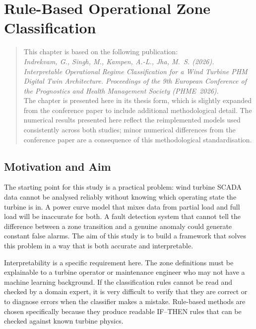 \chapter{Rule-Based Operational Zone Classification}
\label{chap:ch3}

\begin{quote}
\small
This chapter is based on the following publication:\\[4pt]
\textit{Indrekvam, G., Singh, M., Kampen, A.-L., Jha, M.~S. (2026).
Interpretable Operational Regime Classification for a Wind Turbine PHM Digital Twin
Architecture. Proceedings of the 9th European Conference of the Prognostics and Health
Management Society (PHME~2026).}\\[4pt]
The chapter is presented here in its thesis form, which is slightly expanded from the
conference paper to include additional methodological detail. The numerical results
presented here reflect the reimplemented models used consistently across both studies;
minor numerical differences from the conference paper are a consequence of this
methodological standardisation.
\end{quote}

\section{Motivation and Aim}
\label{sec:ch3:motivation}

The starting point for this study is a practical problem: wind turbine SCADA data cannot
be analysed reliably without knowing which operating state the turbine is in. A power
curve model that mixes data from partial load and full load will be inaccurate for both.
A fault detection system that cannot tell the difference between a zone transition and a
genuine anomaly could generate constant false alarms. The aim of this study is to build a
framework that solves this problem in a way that is both accurate and interpretable.

Interpretability is a specific requirement here. The zone
definitions must be explainable to a turbine operator or maintenance engineer who may not
have a machine learning background. If the classification rules cannot be read and checked
by a domain expert, it is very difficult to verify that they are correct or to diagnose
errors when the classifier makes a mistake. Rule-based methods are chosen specifically
because they produce readable IF--THEN rules that can be checked against known turbine
physics.

